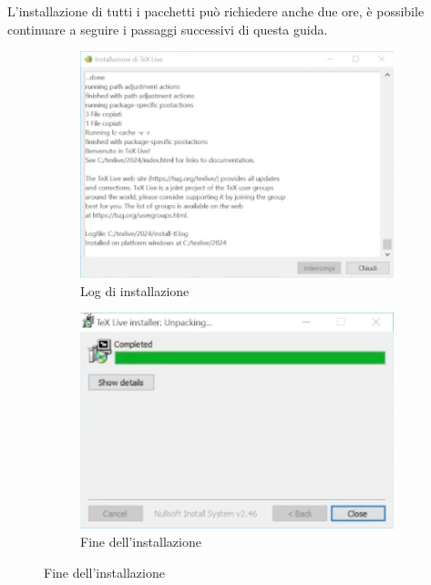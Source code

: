 \documentclass[envcountsame,envcountchap]{svmono}
\begin{document}
L'installazione di tutti i pacchetti può richiedere anche due ore, è possibile continuare a seguire i passaggi successivi di questa guida.
\begin{figure}[H]
    \begin{subfigure}{0.49\textwidth}
        \centering
        \includegraphics[width=\linewidth]{images/texlive/win/8_download_packages.png}
        \caption{Log di installazione}
        \label{texlive_install_log}
    \end{subfigure}
    \begin{subfigure}{0.49\textwidth}
        \centering
        \includegraphics[width=\linewidth]{images/texlive/win/9_end_screen.png}
        \caption{Fine dell'installazione}
        \label{texlive_installato}
    \end{subfigure}
\end{figure}
\end{document}
